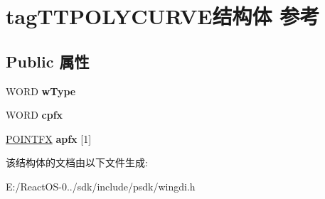 \hypertarget{structtag_t_t_p_o_l_y_c_u_r_v_e}{}\section{tag\+T\+T\+P\+O\+L\+Y\+C\+U\+R\+V\+E结构体 参考}
\label{structtag_t_t_p_o_l_y_c_u_r_v_e}
\subsection*{Public 属性}
\begin{DoxyCompactItemize}
\item 
\mbox{\label{structtag_t_t_p_o_l_y_c_u_r_v_e_ab66056594ebbee285658f5513d120cc0}} 
W\+O\+RD {\bfseries w\+Type}
\item 
\mbox{\label{structtag_t_t_p_o_l_y_c_u_r_v_e_ab6599a366cc82095d45870eb106b3c23}} 
W\+O\+RD {\bfseries cpfx}
\item 
\mbox{\label{structtag_t_t_p_o_l_y_c_u_r_v_e_af788a9d420127f0057742ea686890f29}} 
\hyperlink{structtag_p_o_i_n_t_f_x}{P\+O\+I\+N\+T\+FX} {\bfseries apfx} \mbox{[}1\mbox{]}
\end{DoxyCompactItemize}


该结构体的文档由以下文件生成\+:\begin{DoxyCompactItemize}
\item 
E\+:/\+React\+O\+S-\/0../sdk/include/psdk/wingdi.\+h\end{DoxyCompactItemize}
